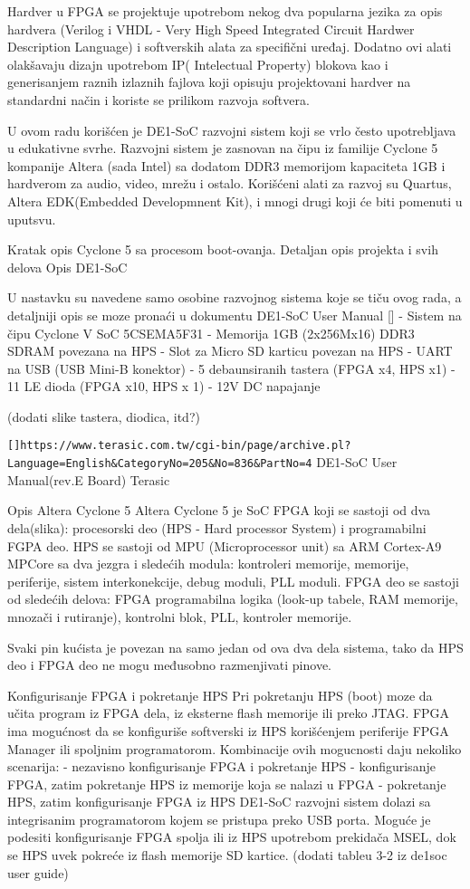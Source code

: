 Hardver u FPGA se projektuje upotrebom nekog dva popularna jezika za opis hardvera (Verilog i VHDL - Very High Speed Integrated Circuit Hardwer Description Language) i softverskih alata za specifični uređaj. Dodatno ovi alati olakšavaju dizajn upotrebom IP( Intelectual Property) blokova kao i generisanjem raznih izlaznih fajlova koji opisuju projektovani hardver na standardni način i koriste se prilikom razvoja softvera.

U ovom radu korišćen je DE1-SoC razvojni sistem koji se vrlo često upotrebljava u edukativne svrhe. Razvojni sistem je zasnovan na čipu iz familije Cyclone 5 kompanije Altera (sada Intel) sa dodatom DDR3 memorijom kapaciteta 1GB i hardverom za audio, video, mrežu i ostalo. Korišćeni alati za razvoj su Quartus, Altera EDK(Embedded Developmnent Kit), i mnogi drugi koji će biti pomenuti u uputsvu.

Kratak opis Cyclone 5 sa procesom boot-ovanja.
Detaljan opis projekta i svih delova
Opis DE1-SoC

U nastavku su navedene samo osobine razvojnog sistema koje se tiču ovog rada, a detaljniji opis se moze pronaći u dokumentu DE1-SoC User Manual []
- Sistem na čipu Cyclone V SoC 5CSEMA5F31
- Memorija 1GB (2x256Mx16) DDR3 SDRAM povezana na HPS
- Slot za Micro SD karticu povezan na HPS
- UART na USB (USB Mini-B konektor)
- 5 debaunsiranih tastera (FPGA x4, HPS x1)
- 11 LE dioda (FPGA x10, HPS x 1)
- 12V DC napajanje

(dodati slike tastera, diodica, itd?)

\verb+[]https://www.terasic.com.tw/cgi-bin/page/archive.pl?Language=English&CategoryNo=205&No=836&PartNo=4+
DE1-SoC User Manual(rev.E Board)
Terasic

Opis Altera Cyclone 5
Altera Cyclone 5 je SoC FPGA koji se sastoji od dva dela(slika): procesorski deo (HPS -  Hard processor System) i programabilni FGPA deo. HPS se sastoji od MPU (Microprocessor unit) sa ARM Cortex-A9 MPCore sa dva jezgra i sledećih modula: kontroleri memorije, memorije, periferije, sistem interkonekcije, debug moduli, PLL moduli. FPGA deo se sastoji od sledećih delova: FPGA programabilna logika (look-up tabele, RAM memorije, mnozači i rutiranje), kontrolni blok, PLL, kontroler memorije.

Svaki pin kućista je povezan na samo jedan od ova dva dela sistema, tako da HPS deo i FPGA deo ne mogu međusobno razmenjivati pinove.

Konfigurisanje FPGA i pokretanje HPS
Pri pokretanju HPS (boot) moze da učita program iz FPGA dela, iz eksterne flash memorije ili preko JTAG. FPGA ima mogućnost da se konfiguriše softverski iz HPS korišćenjem periferije FPGA Manager ili spoljnim programatorom. Kombinacije ovih mogucnosti daju nekoliko scenarija:
- nezavisno konfigurisanje FPGA i pokretanje HPS
- konfigurisanje FPGA, zatim pokretanje HPS iz memorije koja se nalazi u FPGA
- pokretanje HPS, zatim konfigurisanje FPGA iz HPS
DE1-SoC razvojni sistem dolazi sa integrisanim programatorom kojem se pristupa preko USB porta. Moguće je podesiti konfigurisanje FPGA spolja ili iz HPS upotrebom prekidača MSEL, dok se HPS uvek pokreće iz flash memorije SD kartice.
(dodati tableu 3-2 iz de1soc user guide)

